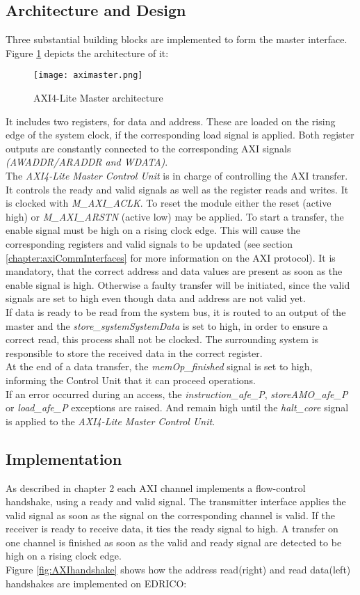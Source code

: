 \subsection{Architecture and Design}
Three substantial building blocks are implemented to form the master interface.
Figure \ref{fig:aximaster} depicts the architecture of it:
\begin{figure}[H]
	\centering
	\texttt{[image: aximaster.png]}
	\caption{AXI4-Lite Master architecture}
	\label{fig:aximaster}
\end{figure}
It includes two registers, for data and address. These are loaded on the rising edge of the system clock, if the corresponding load signal is applied. Both register outputs are constantly connected to the corresponding \ac{AXI} signals \textit{(AWADDR/ARADDR and WDATA)}.\\
The \textit{AXI4-Lite Master Control Unit} is in charge of controlling the \ac{AXI} transfer. It controls the ready and valid signals as well as the register reads and writes. It is clocked with \textit{M\_AXI\_ACLK}. To reset the module either the reset (active high) or \textit{M\_AXI\_ARSTN} (active low) may be applied. To start a transfer, the enable signal must be high on a rising clock edge. This will cause the corresponding registers and valid signals to be updated (see section \ref{chapter:axiCommInterfaces} for more information on the \ac{AXI} protocol). It is mandatory, that the correct address and data values are present as soon as the enable signal is high. Otherwise a faulty transfer will be initiated, since the valid signals are set to high even though data and address are not valid yet. \\
If data is ready to be read from the system bus, it is routed to an output of the master and the \textit{store\_systemSystemData} is set to high, in order to ensure a correct read, this process shall not be clocked. The surrounding system is responsible to store the received data in the correct register.\\
At the end of a data transfer, the \textit{memOp\_finished} signal is set to high, informing the Control Unit that it can proceed operations.\\
If an error occurred during an access, the \textit{instruction\_afe\_P}, \textit{storeAMO\_afe\_P} or \textit{load\_afe\_P} exceptions are raised. And remain high until the \textit{halt\_core} signal is applied to the \textit{AXI4-Lite Master Control Unit}.
\subsection{Implementation}
As described in chapter 2 each \ac{AXI} channel implements a flow-control handshake, using a ready and valid signal. The transmitter interface applies the valid signal as soon as the signal on the corresponding channel is valid. If the receiver is ready to receive data, it ties the ready signal to high. A transfer on one channel is finished as soon as the valid and ready signal are detected to be high on a rising clock edge.\\
Figure \ref{fig:AXIhandshake} shows how the address read(right) and read data(left) handshakes are implemented on \ac{EDRICO}:

